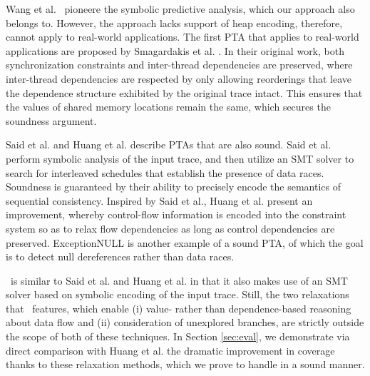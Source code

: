 Wang et al.~\cite{chao} pioneere the symbolic predictive analysis, which our approach also belongs to. However, the approach lacks support of heap encoding, therefore, cannot apply to real-world applications. The first PTA that applies to real-world applications are proposed by Smagardakis et al. \cite{yannis}. In their original work, both synchronization constraints and inter-thread dependencies are preserved, where inter-thread dependencies are respected by only allowing reorderings that leave the dependence structure exhibited by the original trace intact. This ensures that the values of shared memory locations remain the same, which secures the soundness argument.

Said et al. \cite{Said:2011} and Huang et al. \cite{HuangMR14} describe PTAs that are also sound. Said et al. perform symbolic analysis of the input trace, and then utilize an SMT solver to search for interleaved schedules that establish the presence of data races. Soundness is guaranteed by their ability to precisely encode the semantics of sequential consistency. 
Inspired by Said et al., Huang et al. present an improvement, whereby control-flow information is encoded into the constraint system so as to relax flow dependencies as long as control dependencies are preserved.
ExceptionNULL \cite{Farzan:2012} is another example of a sound PTA, of which the goal is to detect null dereferences rather than data races. 

\tool\ is similar to Said et al. and Huang et al. in that it also makes use of an SMT solver based on symbolic encoding of the input trace. Still, the two relaxations that \tool\ features, which enable (i) value- rather than dependence-based reasoning about data flow and (ii) consideration of unexplored branches, are strictly outside the scope of both of these techniques. In Section \ref{sec:eval}, we demonstrate via direct comparison with Huang et al. the dramatic improvement in coverage thanks to these relaxation methods, which we prove to handle in a sound manner.

